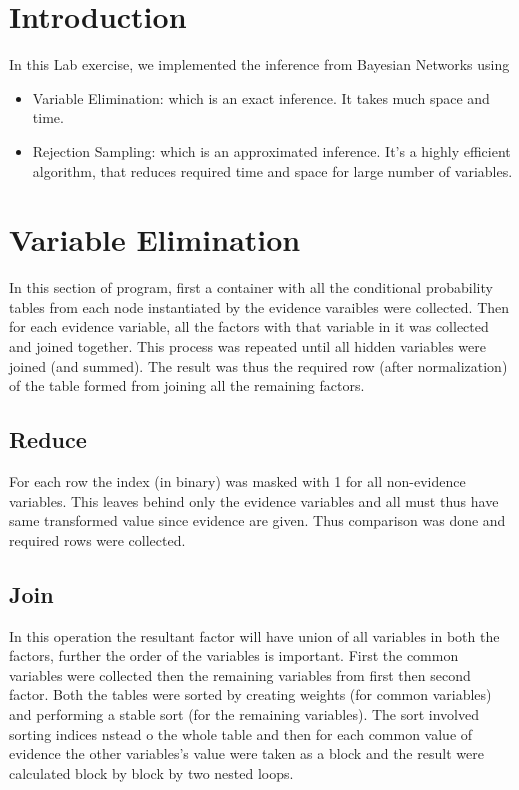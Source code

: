 \documentclass[12pt]{article}
\begin{document}
\maketitle

\section{Introduction}
In this Lab exercise, we implemented the inference from Bayesian Networks using
\begin{itemize}
    \item Variable Elimination: which is an exact inference. It takes much space and time.
    \item Rejection Sampling: which is an approximated inference. It's a highly efficient algorithm, that reduces required time and space for large number of variables.
\end{itemize}

\section{Variable Elimination}
In this section of program, first a container with all the conditional probability tables from each node instantiated by the evidence varaibles were collected. Then for each evidence variable, all the factors with that variable in it was collected and joined together. This process was repeated until all hidden variables were joined (and summed). The result was thus the required row (after normalization) of the table formed from joining all the remaining factors.

\subsection{Reduce}
For each row the index (in binary) was masked with 1 for all non-evidence variables. This leaves behind only the evidence variables and all must thus have same transformed value since evidence are given. Thus comparison was done and required rows were collected.

\subsection{Join}
In this operation the resultant factor will have union of all variables in both the factors, further the order of the variables is important. First the common variables were collected then the remaining variables from first then second factor. Both the tables were sorted by creating weights (for common variables) and performing a stable sort (for the remaining variables). The sort involved sorting indices nstead o the whole table and then for each common value of evidence the other variables's value were taken as a block and the result were calculated block by block by two nested loops.
\end{document}
